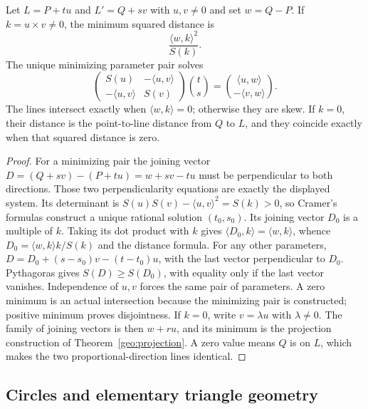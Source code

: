 \begin{theorem}
\label{geo:skew}
Let $L=P+tu$ and $L'=Q+sv$ with $u,v\ne0$ and set $w=Q-P$.
If $k=u\times v\ne0$, the minimum squared distance is
\[
 \frac{\langle w,k\rangle^2}{S(k)}.
\]
The unique minimizing parameter pair solves
\[
 \begin{pmatrix}S(u)&-\langle u,v\rangle\\
 -\langle u,v\rangle&S(v)\end{pmatrix}
 \binom{t}{s}=
 \binom{\langle u,w\rangle}{-\langle v,w\rangle}.
\]
The lines intersect exactly when $\langle w,k\rangle=0$; otherwise they
are skew. If $k=0$, their distance is the point-to-line distance from $Q$
to $L$, and they coincide exactly when that squared distance is zero.
\end{theorem}
\begin{proof}
For a minimizing pair the joining vector
$D=(Q+sv)-(P+tu)=w+sv-tu$ must be perpendicular to both directions.
Those two perpendicularity equations are exactly the displayed system.
Its determinant is $S(u)S(v)-\langle u,v\rangle^2=S(k)>0$, so Cramer's
formulas construct a unique rational solution $(t_0,s_0)$. Its joining
vector $D_0$ is a multiple of $k$. Taking its dot product with $k$ gives
$\langle D_0,k\rangle=\langle w,k\rangle$, whence
$D_0=\langle w,k\rangle k/S(k)$ and the distance formula.
For any other parameters,
$D=D_0+(s-s_0)v-(t-t_0)u$, with the last vector perpendicular to $D_0$.
Pythagoras gives $S(D)\ge S(D_0)$, with equality only if the last vector
vanishes. Independence of $u,v$ forces the same pair of parameters.
A zero minimum is an actual intersection because the minimizing pair is
constructed; positive minimum proves disjointness. If $k=0$, write
$v=\lambda u$ with $\lambda\ne0$. The family of joining vectors is then
$w+ru$, and its minimum is the projection construction of
Theorem~\ref{geo:projection}. A zero value means $Q$ is on $L$, which
makes the two proportional-direction lines identical.
\end{proof}

\subsection{Circles and elementary triangle geometry}

